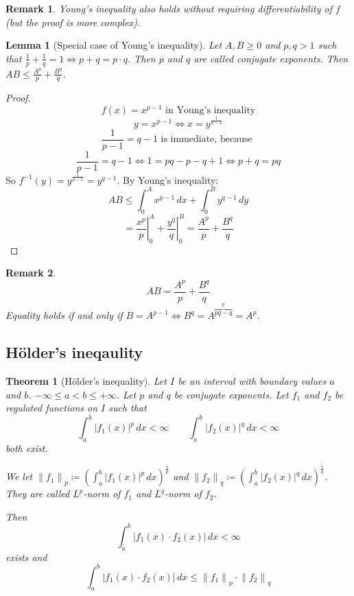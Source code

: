 \documentclass{article}
\newtheorem{theorem}{Theorem}  \numberwithin{theorem}{section}
\newtheorem{lemma}{Lemma}  \numberwithin{lemma}{section}
\newtheorem{remark}{Remark}  \numberwithin{remark}{section}
\newcommand{\norm}[1]{\left\|#1\right\|}
\newcommand{\card}[1]{\left|#1\right|}
\begin{document}
\begin{remark}
  Young's inequality also holds without requiring differentiability of $f$ (but the proof is more complex).
\end{remark}

\begin{lemma}[Special case of Young's inequality] %
  \label{lemma14}
  Let $A, B \geq 0$ and $p,q > 1$ such that $\frac1p + \frac1q = 1 \iff p + q = p \cdot q$.
  Then $p$ and $q$ are called \emph{conjugate exponents}.
  Then $AB \leq \frac{A^p}{p} + \frac{B^q}{q}$.
\end{lemma}
\begin{proof}
  \[ f(x) = x^{p-1} \text{ in Young's inequality} \]
  \[ y = x^{p-1} \iff x = y^{\frac{1}{p-1}} \]
  \[ \frac{1}{p-1} = q - 1 \text{ is immediate, because } \]
  \[ \frac{1}{p-1} = q - 1 \iff 1 = pq - p - q + 1 \iff p + q = pq \]
  So $f^{-1}(y) = y^{\frac{1}{p-1}} = y^{q - 1}$.
  By Young's inequality:
  \[ AB \leq \int_0^A x^{p-1} \, dx + \int_0^B y^{q - 1} \, dy \]
  \[ = \left.\frac{x^p}{p}\right|_0^A + \left. \frac{y^q}{q} \right|_0^B = \frac{A^p}{p} + \frac{B^q}{q} \]
\end{proof}

\begin{remark}
  \[ AB = \frac{A^p}{p} + \frac{B^q}{q} \]
  Equality holds if and only if $B = A^{p-1} \iff B^q = A^{\overbrace{pq-q}^{p}} = A^p$.
\end{remark}

\subsection{H\"older's ineqaulity}

\begin{theorem}[H\"older's inequality] %
  Let $I$ be an interval with boundary values $a$ and $b$. $-\infty \leq a < b \leq +\infty$.
  Let $p$ and $q$ be conjugate exponents. Let $f_1$ and $f_2$ be regulated functions on $I$
  such that
  \[ \int_a^b \card{f_1(x)}^p \, dx < \infty \qquad \int_a^b \card{f_2(x)}^q \, dx < \infty \]
  both exist.

  We let $\norm{f_1}_p \coloneqq \left(\int_a^b \card{f_1(x)}^p \, dx\right)^{\frac1p}$ and $\norm{f_2}_q \coloneqq \left(\int_a^b \card{f_2(x)}^q \, dx\right)^{\frac1q}$.
  They are called $L^p$-norm of $f_1$ and $L^q$-norm of $f_2$.

  Then
  \[ \int_a^b \card{f_1(x) \cdot f_2(x)} \, dx < \infty \]
  exists and
  \[ \int_a^b \card{f_1(x) \cdot f_2(x)} \, dx \leq \norm{f_1}_p \cdot \norm{f_2}_q \]
\end{theorem}
\end{document}
